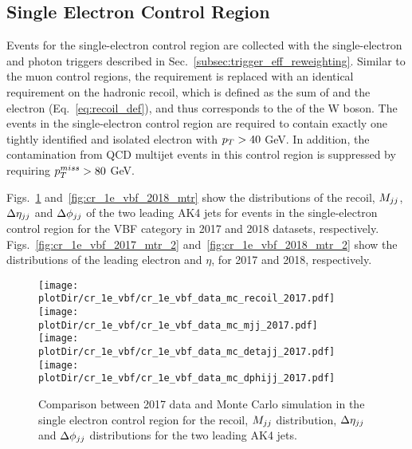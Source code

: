 \clearpage

\subsection{Single Electron Control Region}
\label{sec:selection_cr_1e}

Events for the single-electron control region are collected with the single-electron and photon triggers described in Sec.~\ref{subsec:trigger_eff_reweighting}.
Similar to the muon control regions, the \ptmiss requirement is replaced with an identical requirement on the hadronic recoil, which is defined as the sum of \ptvecmiss 
and the electron \vpt (Eq.~\ref{eq:recoil_def}), and thus corresponds to the \pt of the W boson.
The events in the single-electron control region are required to contain exactly one tightly identified and isolated electron with $p_T > 40$ GeV.
In addition, the contamination from QCD multijet events in this control region is suppressed by requiring $p_T^{miss} > 80$ GeV.

Figs.~\ref{fig:cr_1e_vbf_2017_mtr} and~\ref{fig:cr_1e_vbf_2018_mtr} show the distributions of the recoil, $M_{jj}$, $\Delta \eta_{jj}$ and 
$\Delta \phi_{jj}$ of the two leading AK4 jets for events in the single-electron control region for the VBF category in 2017 and 2018 
datasets, respectively.
Figs.~\ref{fig:cr_1e_vbf_2017_mtr_2} and~\ref{fig:cr_1e_vbf_2018_mtr_2} show the distributions of the leading electron \pt and $\eta$, 
for 2017 and 2018, respectively.

\begin{figure}[htbp]
    \begin{center}
        \texttt{[image: \\plotDir/cr\_1e\_vbf/cr\_1e\_vbf\_data\_mc\_recoil\_2017.pdf]}
        \texttt{[image: \\plotDir/cr\_1e\_vbf/cr\_1e\_vbf\_data\_mc\_mjj\_2017.pdf]} \\
        \texttt{[image: \\plotDir/cr\_1e\_vbf/cr\_1e\_vbf\_data\_mc\_detajj\_2017.pdf]}
        \texttt{[image: \\plotDir/cr\_1e\_vbf/cr\_1e\_vbf\_data\_mc\_dphijj\_2017.pdf]}
    \end{center}
    \caption{Comparison between 2017 data and Monte Carlo simulation in the single electron control region for
        the recoil, $M_{jj}$ distribution, $\Delta \eta_{jj}$ and $\Delta \phi_{jj}$ distributions for the two leading AK4 jets.}
    \label{fig:cr_1e_vbf_2017_mtr}
\end{figure}

